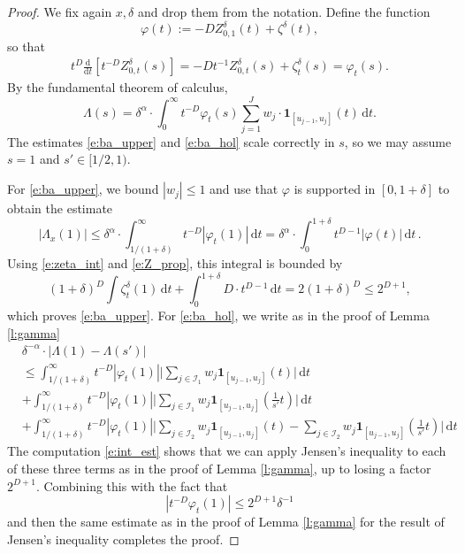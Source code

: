 \documentclass[12pt,reqno,a4paper,dvipsnames]{amsart}
\theoremstyle{plain}
\theoremstyle{definition}
\numberwithin{theorem}{section}
\numberwithin{equation}{section}
\newcommand{\AD}{D}
\begin{document}
    \begin{proof}
        We fix again $x, \delta$ and drop them from the notation.
        Define the function
        \[
            \varphi(t) := -\AD Z^\delta_{0,1}(t) + \zeta^\delta(t),
        \]
        so that 
        \begin{align*}
            t^{\AD} \frac{\mathrm{d}}{\mathrm{d}t}[t^{-\AD} Z^\delta_{0, t}(s)] = -\AD  t^{-1} Z^\delta_{0,t} (s) + \zeta^\delta_t(s) = \varphi_t(s).
        \end{align*}
        By the fundamental theorem of calculus,
        \[
            \Lambda(s) = \delta^\alpha \cdot \int_0^\infty t^{-\AD} \varphi_t(s) \sum_{j=1}^J w_j \cdot \mathbf{1}_{[u_{j-1}, u_j]}(t) \, \mathrm{d}t.
        \]
        The estimates \eqref{e:ba_upper} and \eqref{e:ba_hol} scale correctly in $s$, so we may assume $s = 1$ and $s' \in [1/2, 1)$.
        
        For \eqref{e:ba_upper}, we bound $|w_j| \le 1$ and use that $\varphi$ is supported in $[0,1+\delta]$ to obtain the estimate
        \begin{equation*}
            |\Lambda_x(1)| \le \delta^\alpha \cdot \int_{1/(1+\delta)}^\infty t^{-\AD} |\varphi_t(1)| \, \mathrm{d}t = \delta^\alpha \cdot \int_0^{1+\delta} t^{\AD - 1} |\varphi(t)| \, \mathrm{d}t\,.
        \end{equation*}
        Using \eqref{e:zeta_int} and \eqref{e:Z_prop}, this integral is bounded by
        \begin{equation}\label{e:int_est}
            (1 + \delta)^\AD \int \zeta^\delta_t(1) \, \mathrm{d}t + \int_0^{1+\delta} \AD \cdot t^{\AD - 1} \, \mathrm{d}t = 2 (1 + \delta)^\AD \le 2^{\AD + 1}, 
        \end{equation}
        which proves \eqref{e:ba_upper}.
        For \eqref{e:ba_hol}, we write as in the proof of Lemma \ref{l:gamma} 
        \begin{align*}
            &\delta^{-\alpha}\cdot |\Lambda(1) - \Lambda(s')|\\
            &\le \int_{1/(1+\delta)}^\infty t^{-\AD}|\varphi_t(1)| \Big| \sum_{j \in \mathcal{I}_1} w_j \mathbf{1}_{[u_{j-1},u_j]}(t) \Big| \, \mathrm{d}t \\
            &+ \int_{1/(1+\delta)}^\infty t^{-\AD}|\varphi_t(1)| \Big| \sum_{j \in \mathcal{I}_1} w_j \mathbf{1}_{[u_{j-1},u_j]}(\frac{1}{s'} t) \Big| \, \mathrm{d}t\\
            &+ \int_{1/(1+\delta)}^\infty t^{-\AD}|\varphi_t(1)| \Big| \sum_{j \in \mathcal{I}_2} w_j \mathbf{1}_{[u_{j-1},u_j]}(t)  - \sum_{j \in \mathcal{I}_2} w_j \mathbf{1}_{[u_{j-1},u_j]}(\frac{1}{s'}t) \Big| \, \mathrm{d}t
        \end{align*}
        The computation \eqref{e:int_est} shows that we can apply Jensen's inequality to each of these three terms as in the proof of Lemma \ref{l:gamma}, up to losing a factor $2^{\AD + 1}$. Combining this with the fact that 
        \[
            |t^{-\AD}\varphi_t(1)| \le 2^{\AD + 1} \delta^{-1}
        \]
        and then the same estimate as in the proof of Lemma \ref{l:gamma} for the result of Jensen's inequality completes the proof. 
    \end{proof}
\end{document}
